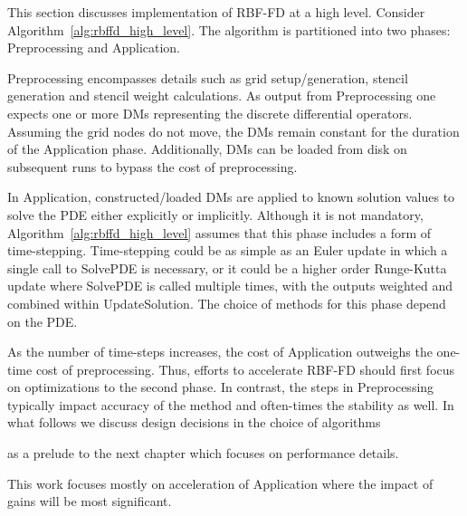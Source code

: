 \documentclass[11pt]{report}
\begin{document}
{This section discusses implementation of RBF-FD at a high level. Consider Algorithm~\ref{alg:rbffd_high_level}. The algorithm is partitioned into two phases: Preprocessing and Application. 

Preprocessing encompasses details such as grid setup/generation, stencil generation and stencil weight calculations. As output from Preprocessing one expects one or more DMs representing the discrete differential operators. Assuming the grid nodes do not move, the DMs remain constant for the duration of the Application phase. Additionally, DMs can be loaded from disk on subsequent runs to bypass the cost of preprocessing. 

In Application, constructed/loaded DMs are applied to known solution values to solve the PDE either explicitly or implicitly. Although it is not mandatory, Algorithm~\ref{alg:rbffd_high_level} assumes that this phase includes a form of time-stepping. Time-stepping could be as simple as an Euler update in which a single call to SolvePDE is necessary, or it could be a higher order Runge-Kutta update where SolvePDE is called multiple times, with the outputs weighted and combined within UpdateSolution. The choice of methods for this phase depend on the PDE. 

As the number of time-steps increases, the cost of Application outweighs the one-time cost of preprocessing. Thus, efforts to accelerate RBF-FD should first focus on optimizations to the second phase. In contrast, the steps in Preprocessing typically impact accuracy of the method and often-times the stability as well. 
In what follows we discuss design decisions in the choice of algorithms 

as a prelude to the next chapter which focuses on performance details. 

This work focuses mostly on acceleration of Application where the impact of gains will be most significant. 


}
\end{document}
